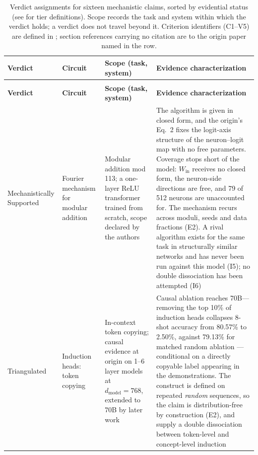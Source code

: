 \documentclass{article}
\begin{document}
\clearpage
{\footnotesize
\renewcommand{\arraystretch}{1.1}
\begin{longtable}{@{}>{\raggedright\arraybackslash}p{2.2cm}>{\raggedright\arraybackslash}p{2.2cm}>{\raggedright\arraybackslash}p{3.4cm}>{\raggedright\arraybackslash}p{7.4cm}@{}}
\caption{Verdict assignments for sixteen mechanistic claims, sorted by evidential status (see  for tier definitions). Scope records the task and system within which the verdict holds; a verdict does not travel beyond it. Criterion identifiers (C1--V5) are defined in ; section references carrying no citation are to the origin paper named in the row.}
\label{tab:case-studies}\\
\toprule
\textbf{Verdict} & \textbf{Circuit} & \textbf{Scope (task, system)} & \textbf{Evidence characterization} \\
\midrule
\endfirsthead
\multicolumn{4}{@{}l}{\emph{Table \thetable, continued from previous page}}\\
\toprule
\textbf{Verdict} & \textbf{Circuit} & \textbf{Scope (task, system)} & \textbf{Evidence characterization} \\
\midrule
\endhead
\endfoot
\bottomrule
\endlastfoot
Mechanistically Supported & Fourier mechanism for modular addition \citep{nanda2023progress} & Modular addition mod 113; a one-layer ReLU transformer trained from scratch, scope declared by the authors & The algorithm is given in closed form, and the origin's Eq.~2 fixes the logit-axis structure of the neuron--logit map with no free parameters. Coverage stops short of the model: $W_{\mathrm{in}}$ receives no closed form, the neuron-side directions are free, and 79 of 512 neurons are unaccounted for. The mechanism recurs across moduli, seeds and data fractions (E2). A rival algorithm exists for the same task in structurally similar networks \citep{zhong2023clock} and has never been run against this model (I5); no double dissociation has been attempted (I6) \\
\midrule
Triangulated & Induction heads: token copying \citep{olsson2022context} & In-context token copying; causal evidence at origin on 1--6 layer models at $d_{\mathrm{model}} = 768$, extended to 70B by later work & Causal ablation reaches 70B---removing the top 10\% of induction heads collapses 8-shot accuracy from 80.57\% to 2.50\%, against 79.13\% for matched random ablation \citep{yang2025unifying}---conditional on a directly copyable label appearing in the demonstrations. The construct is defined on repeated \emph{random} sequences, so the claim is distribution-free by construction (E2), and \citet{feucht2025dual} supply a double dissociation between token-level and concept-level induction \\

\end{longtable}}
\end{document}
